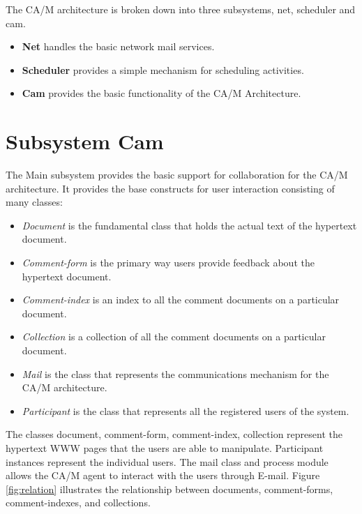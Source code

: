  
The CA/M architecture is broken down into three subsystems, net, scheduler
and cam.
\begin{itemize}
\item{\bf Net} handles the basic network mail services.
\item{\bf Scheduler} provides a simple mechanism for scheduling activities.
\item{\bf Cam} provides the basic functionality of the CA/M Architecture.
\end{itemize}

\section{Subsystem Cam}


The Main subsystem provides the basic support for collaboration for the
CA/M architecture.  It provides the base constructs for user interaction
consisting of many classes:
\begin{itemize}
\item{\em Document} is the fundamental class that holds the actual text of
the hypertext document.
\item{\em  Comment-form} is the primary way users provide feedback about the
hypertext document.
\item{\em Comment-index} is an index to all the comment documents on a particular
document.
\item{\em Collection} is a collection of all the comment documents on a
particular document.
\item{\em Mail} is the class that represents the communications mechanism for
the CA/M architecture.
\item{\em Participant} is the class that represents all the registered
users of the system.
\end{itemize}

The classes document, comment-form, comment-index, collection represent the
hypertext WWW pages that the users are able to manipulate.  Participant
instances represent the individual users. The mail class and process module
allows the CA/M agent to interact with the users through E-mail.  Figure
\ref{fig:relation} illustrates the relationship between documents,
comment-forms, comment-indexes, and collections.


